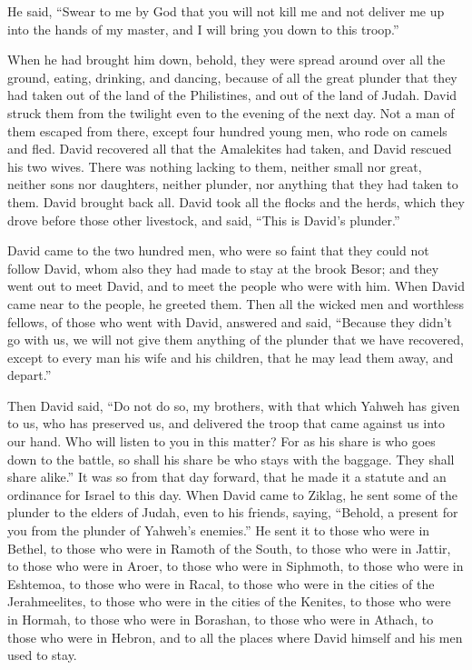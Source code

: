 {\par }{\PP He said, “Swear to me by God that you will not kill me and not deliver me up into the hands of my master, and I will bring you down to this troop.”
\par }{\PP {}When he had brought him down, behold, they were spread around over all the ground, eating, drinking, and dancing, because of all the great plunder that they had taken out of the land of the Philistines, and out of the land of Judah.
David struck them from the twilight even to the evening of the next day. Not a man of them escaped from there, except four hundred young men, who rode on camels and fled.
David recovered all that the Amalekites had taken, and David rescued his two wives.
There was nothing lacking to them, neither small nor great, neither sons nor daughters, neither plunder, nor anything that they had taken to them. David brought back all.
David took all the flocks and the herds, which they drove before those other livestock, and said, “This is David’s plunder.”
\par }{\PP {}David came to the two hundred men, who were so faint that they could not follow David, whom also they had made to stay at the brook Besor; and they went out to meet David, and to meet the people who were with him. When David came near to the people, he greeted them.
Then all the wicked men and worthless fellows, of those who went with David, answered and said, “Because they didn’t go with us, we will not give them anything of the plunder that we have recovered, except to every man his wife and his children, that he may lead them away, and depart.”
\par }{\PP {}Then David said, “Do not do so, my brothers, with that which Yahweh has given to us, who has preserved us, and delivered the troop that came against us into our hand.
Who will listen to you in this matter? For as his share is who goes down to the battle, so shall his share be who stays with the baggage. They shall share alike.”
It was so from that day forward, that he made it a statute and an ordinance for Israel to this day.
When David came to Ziklag, he sent some of the plunder to the elders of Judah, even to his friends, saying, “Behold, a present for you from the plunder of Yahweh’s enemies.”
He sent it to those who were in Bethel, to those who were in Ramoth of the South, to those who were in Jattir,
to those who were in Aroer, to those who were in Siphmoth, to those who were in Eshtemoa,
to those who were in Racal, to those who were in the cities of the Jerahmeelites, to those who were in the cities of the Kenites,
to those who were in Hormah, to those who were in Borashan, to those who were in Athach,
to those who were in Hebron, and to all the places where David himself and his men used to stay.

}
